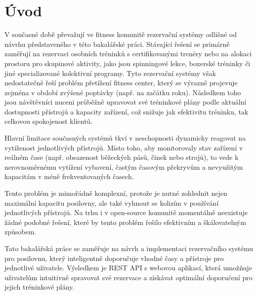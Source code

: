 \chapter{Úvod}
\label{sec:Introduction}
V současné době převažují ve fitness komunitě rezervační systémy odlišné od návrhu představeného v této bakalářské práci. Stávající řešení se primárně zaměřují na rezervaci osobních tréninků s certifikovanými trenéry nebo na alokaci prostoru pro skupinové aktivity, jako jsou spinningové lekce, boxerské tréninky či jiné specializované kolektivní programy. Tyto rezervační systémy však nedostatečně řeší problém přetížení fitness center, který se výrazně projevuje zejména v období zvýšené poptávky (např. na začátku roku). Následkem toho jsou návštěvníci nuceni průběžně upravovat své tréninkové plány podle aktuální dostupnosti přístrojů a kapacity zařízení, což snižuje jak efektivitu tréninku, tak celkovou spokojenost klientů.

Hlavní limitace současných systémů tkví v neschopnosti dynamicky reagovat na vytíženost jednotlivých přístrojů. Místo toho, aby monitorovaly stav zařízení v reálném čase (např. obsazenost běžeckých pásů, činek nebo strojů), to vede k nerovnoměrnému vytížení vybavení, častým časovým překryvům a nevyužitým kapacitám v méně frekventovaných časech.

Tento problém je mimořádně komplexní, protože je nutné zohlednit nejen maximální kapacitu posilovny, ale také vyhnout se kolizím v používání jednotlivých přístrojů. Na trhu i v open-source komunitě momentálně neexistuje žádné podobné řešení, které by tento problém řešilo efektivním a škálovatelným způsobem.

Tato bakalářská práce se zaměřuje na návrh a implementaci rezervačního systému pro posilovnu, který inteligentně doporučuje vhodné časy a přístroje pro jednotlivé uživatele. Výsledkem je REST API s webovou aplikací, která umožňuje uživatelům intuitivně spravovat své rezervace a získávat optimální doporučení pro jejich tréninkové plány.
\endinput
